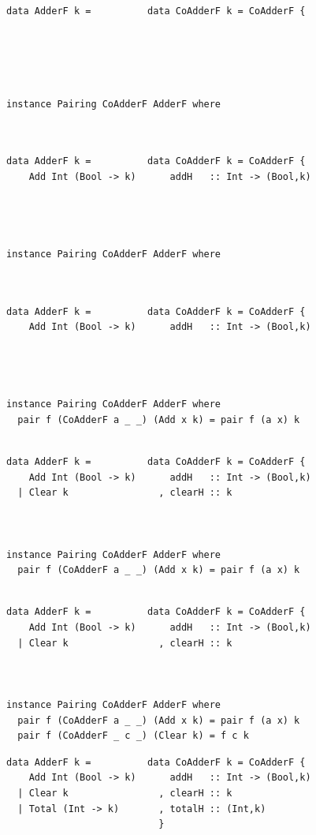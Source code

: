 \documentclass{beamer}
\begin{document}
\begin{frame}[fragile]
  \begin{overprint}
  \begin{verbatim}
data AdderF k =          data CoAdderF k = CoAdderF {





instance Pairing CoAdderF AdderF where



  \end{verbatim}
  \begin{verbatim}
data AdderF k =          data CoAdderF k = CoAdderF {
    Add Int (Bool -> k)      addH   :: Int -> (Bool,k)




instance Pairing CoAdderF AdderF where



  \end{verbatim}
  \begin{verbatim}
data AdderF k =          data CoAdderF k = CoAdderF {
    Add Int (Bool -> k)      addH   :: Int -> (Bool,k)




instance Pairing CoAdderF AdderF where
  pair f (CoAdderF a _ _) (Add x k) = pair f (a x) k


  \end{verbatim}
  \begin{verbatim}
data AdderF k =          data CoAdderF k = CoAdderF {
    Add Int (Bool -> k)      addH   :: Int -> (Bool,k)
  | Clear k                , clearH :: k



instance Pairing CoAdderF AdderF where
  pair f (CoAdderF a _ _) (Add x k) = pair f (a x) k


  \end{verbatim}
  \begin{verbatim}
data AdderF k =          data CoAdderF k = CoAdderF {
    Add Int (Bool -> k)      addH   :: Int -> (Bool,k)
  | Clear k                , clearH :: k



instance Pairing CoAdderF AdderF where
  pair f (CoAdderF a _ _) (Add x k) = pair f (a x) k
  pair f (CoAdderF _ c _) (Clear k) = f c k

  \end{verbatim}
  \begin{verbatim}
data AdderF k =          data CoAdderF k = CoAdderF {
    Add Int (Bool -> k)      addH   :: Int -> (Bool,k)
  | Clear k                , clearH :: k
  | Total (Int -> k)       , totalH :: (Int,k)
                           }


\end{verbatim}
\end{overprint}
\end{frame}
\end{document}
